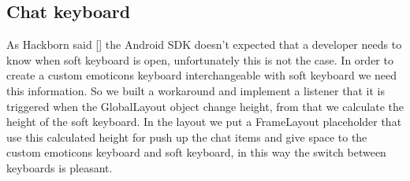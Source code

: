 \subsection{Chat keyboard}
As Hackborn said [] the Android SDK doesn’t expected that a developer needs to know when soft keyboard is open, unfortunately this is not the case. In order to create a custom emoticons keyboard interchangeable with soft keyboard we need this information. So we built a workaround and implement a listener that it is triggered when the GlobalLayout object change height, from that we calculate the height of the soft keyboard. In the layout we put a FrameLayout placeholder that use this calculated height for push up the chat items and give space to the custom emoticons keyboard and soft keyboard, in this way the switch between keyboards is pleasant.

